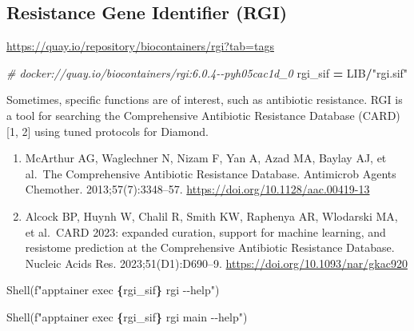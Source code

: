 \documentclass[
]{book}
\newenvironment{Shaded}{\begin{snugshade}}{\end{snugshade}}
\newcommand{\CommentTok}[1]{\textcolor[rgb]{0.56,0.35,0.01}{\textit{#1}}}
\newcommand{\NormalTok}[1]{#1}
\newcommand{\OperatorTok}[1]{\textcolor[rgb]{0.81,0.36,0.00}{\textbf{#1}}}
\newcommand{\SpecialCharTok}[1]{\textcolor[rgb]{0.81,0.36,0.00}{\textbf{#1}}}
\newcommand{\SpecialStringTok}[1]{\textcolor[rgb]{0.31,0.60,0.02}{#1}}
\newcommand{\StringTok}[1]{\textcolor[rgb]{0.31,0.60,0.02}{#1}}
\providecommand{\tightlist}{%
  \setlength{\itemsep}{0pt}\setlength{\parskip}{0pt}}
\begin{document}
\subsection{Resistance Gene Identifier (RGI)}\label{resistance-gene-identifier-rgi}

\url{https://quay.io/repository/biocontainers/rgi?tab=tags}

\begin{Shaded}
\begin{Highlighting}[numbers=left,,]
\CommentTok{\# docker://quay.io/biocontainers/rgi:6.0.4{-}{-}pyh05cac1d\_0}
\NormalTok{rgi\_sif }\OperatorTok{=}\NormalTok{ LIB}\OperatorTok{/}\StringTok{"rgi.sif"}
\end{Highlighting}
\end{Shaded}

Sometimes, specific functions are of interest, such as antibiotic resistance.
RGI is a tool for searching the Comprehensive Antibiotic Resistance Database (CARD) {[}1, 2{]} using tuned protocols for Diamond.

\begin{enumerate}
\def\labelenumi{\arabic{enumi}.}
\tightlist
\item
  McArthur AG, Waglechner N, Nizam F, Yan A, Azad MA, Baylay AJ, et al.~The Comprehensive Antibiotic Resistance Database. Antimicrob Agents Chemother. 2013;57(7):3348--57. \url{https://doi.org/10.1128/aac.00419-13}
\item
  Alcock BP, Huynh W, Chalil R, Smith KW, Raphenya AR, Wlodarski MA, et al.~CARD 2023: expanded curation, support for machine learning, and resistome prediction at the Comprehensive Antibiotic Resistance Database. Nucleic Acids Res. 2023;51(D1):D690--9. \url{https://doi.org/10.1093/nar/gkac920}
\end{enumerate}

\begin{Shaded}
\begin{Highlighting}[numbers=left,,]
\NormalTok{Shell(}\SpecialStringTok{f"apptainer exec }\SpecialCharTok{\{}\NormalTok{rgi\_sif}\SpecialCharTok{\}}\SpecialStringTok{ rgi {-}{-}help"}\NormalTok{)}
\end{Highlighting}
\end{Shaded}

\begin{Shaded}
\begin{Highlighting}[numbers=left,,]
\NormalTok{Shell(}\SpecialStringTok{f"apptainer exec }\SpecialCharTok{\{}\NormalTok{rgi\_sif}\SpecialCharTok{\}}\SpecialStringTok{ rgi main {-}{-}help"}\NormalTok{)}
\end{Highlighting}
\end{Shaded}
\end{document}
